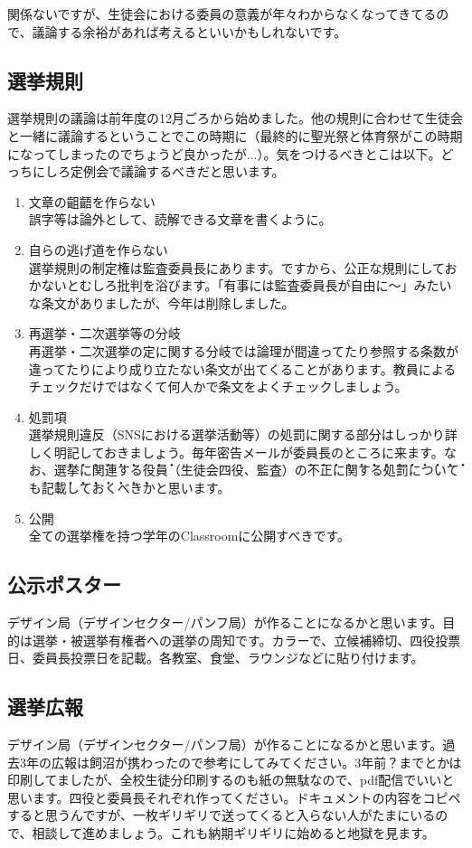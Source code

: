\documentclass[a4paper]{ltjsreport}
\begin{document}
関係ないですが、生徒会における委員の意義が年々わからなくなってきてるので、議論する余裕があれば考えるといいかもしれないです。

\subsection{選挙規則}
選挙規則の議論は前年度の12月ごろから始めました。他の規則に合わせて生徒会と一緒に議論するということでこの時期に（最終的に聖光祭と体育祭がこの時期になってしまったのでちょうど良かったが...）。気をつけるべきとこは以下。どっちにしろ定例会で議論するべきだと思います。

\begin{enumerate}
  \item 文章の齟齬を作らない\\
        誤字等は論外として、読解できる文章を書くように。
  \item 自らの逃げ道を作らない\\
        選挙規則の制定権は監査委員長にあります。ですから、公正な規則にしておかないとむしろ批判を浴びます。「有事には監査委員長が自由に〜」みたいな条文がありましたが、今年は削除しました。
  \item 再選挙・二次選挙等の分岐\\
        再選挙・二次選挙の定に関する分岐では論理が間違ってたり参照する条数が違ってたりにより成り立たない条文が出てくることがあります。教員によるチェックだけではなくて何人かで条文をよくチェックしましょう。
  \item 処罰項\\
        選挙規則違反（SNSにおける選挙活動等）の処罰に関する部分はしっかり詳しく明記しておきましょう。毎年密告メールが委員長のところに来ます。なお、\.選\.挙\.に\.関\.連\.す\.る\.役\.員（生徒会四役、監査）\.の\.不\.正\.に\.関\.す\.る\.処\.罰\.に\.つ\.い\.て\.も\.記\.載\.し\.て\.お\.く\.べ\.きかと思います。
  \item 公開\\
        全ての選挙権を持つ学年のClassroomに公開すべきです。
\end{enumerate}

\subsection{公示ポスター}
デザイン局（デザインセクター/パンフ局）が作ることになるかと思います。目的は選挙・被選挙有権者への選挙の周知です。カラーで、立候補締切、四役投票日、委員長投票日を記載。各教室、食堂、ラウンジなどに貼り付けます。

\subsection{選挙広報}
デザイン局（デザインセクター/パンフ局）が作ることになるかと思います。過去3年の広報は飼沼が携わったので参考にしてみてください。3年前？までとかは印刷してましたが、全校生徒分印刷するのも紙の無駄なので、pdf配信でいいと思います。四役と委員長それぞれ作ってください。ドキュメントの内容をコピペすると思うんですが、一枚ギリギリで送ってくると入らない人がたまにいるので、相談して進めましょう。これも納期ギリギリに始めると地獄を見ます。
\end{document}
